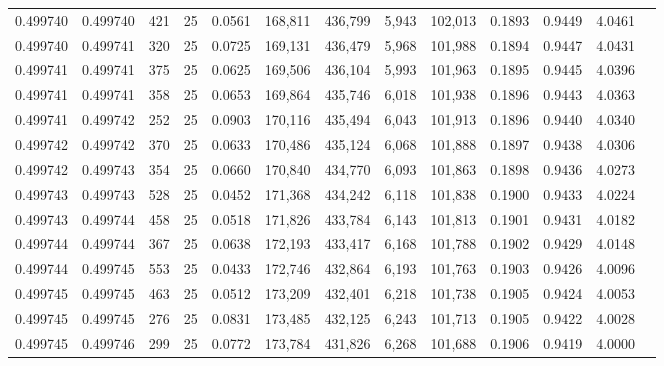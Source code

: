 \begin{tabular}{rrrrrrrrrrrrr}
0.499740 & 0.499740 &   421 &  25 &                                     0.0561 & 168,811 & 436,799 &   5,943 & 102,013 & 0.1893 & 0.9449 & 4.0461 \\
0.499740 & 0.499741 &   320 &  25 &                                     0.0725 & 169,131 & 436,479 &   5,968 & 101,988 & 0.1894 & 0.9447 & 4.0431 \\
0.499741 & 0.499741 &   375 &  25 &                                     0.0625 & 169,506 & 436,104 &   5,993 & 101,963 & 0.1895 & 0.9445 & 4.0396 \\
0.499741 & 0.499741 &   358 &  25 &                                     0.0653 & 169,864 & 435,746 &   6,018 & 101,938 & 0.1896 & 0.9443 & 4.0363 \\
0.499741 & 0.499742 &   252 &  25 &                                     0.0903 & 170,116 & 435,494 &   6,043 & 101,913 & 0.1896 & 0.9440 & 4.0340 \\
0.499742 & 0.499742 &   370 &  25 &                                     0.0633 & 170,486 & 435,124 &   6,068 & 101,888 & 0.1897 & 0.9438 & 4.0306 \\
0.499742 & 0.499743 &   354 &  25 &                                     0.0660 & 170,840 & 434,770 &   6,093 & 101,863 & 0.1898 & 0.9436 & 4.0273 \\
0.499743 & 0.499743 &   528 &  25 &                                     0.0452 & 171,368 & 434,242 &   6,118 & 101,838 & 0.1900 & 0.9433 & 4.0224 \\
0.499743 & 0.499744 &   458 &  25 &                                     0.0518 & 171,826 & 433,784 &   6,143 & 101,813 & 0.1901 & 0.9431 & 4.0182 \\
0.499744 & 0.499744 &   367 &  25 &                                     0.0638 & 172,193 & 433,417 &   6,168 & 101,788 & 0.1902 & 0.9429 & 4.0148 \\
0.499744 & 0.499745 &   553 &  25 &                                     0.0433 & 172,746 & 432,864 &   6,193 & 101,763 & 0.1903 & 0.9426 & 4.0096 \\
0.499745 & 0.499745 &   463 &  25 &                                     0.0512 & 173,209 & 432,401 &   6,218 & 101,738 & 0.1905 & 0.9424 & 4.0053 \\
0.499745 & 0.499745 &   276 &  25 &                                     0.0831 & 173,485 & 432,125 &   6,243 & 101,713 & 0.1905 & 0.9422 & 4.0028 \\
0.499745 & 0.499746 &   299 &  25 &                                     0.0772 & 173,784 & 431,826 &   6,268 & 101,688 & 0.1906 & 0.9419 & 4.0000 \\

\end{tabular}
